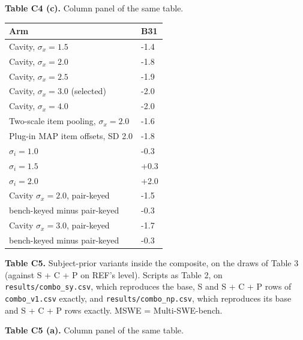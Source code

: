 \documentclass[
]{article}
\begin{document}
\textbf{Table C4 (c).} Column panel of the same table.

\begin{longtable}[]{@{}ll@{}}
\toprule\noalign{}
Arm & B31 \\
\midrule\noalign{}
\endhead
\bottomrule\noalign{}
\endlastfoot
Cavity, \(\sigma_x = 1.5\) & -1.4 \\
Cavity, \(\sigma_x = 2.0\) & -1.8 \\
Cavity, \(\sigma_x = 2.5\) & -1.9 \\
Cavity, \(\sigma_x = 3.0\) (selected) & -2.0 \\
Cavity, \(\sigma_x = 4.0\) & -2.0 \\
Two-scale item pooling, \(\sigma_x = 2.0\) & -1.6 \\
Plug-in MAP item offsets, SD 2.0 & -1.8 \\
\(\sigma_i = 1.0\) & -0.3 \\
\(\sigma_i = 1.5\) & +0.3 \\
\(\sigma_i = 2.0\) & +2.0 \\
Cavity \(\sigma_x = 2.0\), pair-keyed & -1.5 \\
bench-keyed minus pair-keyed & -0.3 \\
Cavity \(\sigma_x = 3.0\), pair-keyed & -1.7 \\
bench-keyed minus pair-keyed & -0.3 \\
\end{longtable}

\textbf{Table C5.} Subject-prior variants inside the composite, on the
draws of Table 3 (against S + C + P on REF's level). Scripts as Table 2,
on \texttt{results/combo\_sy.csv}, which reproduces the base, S and S +
C + P rows of \texttt{combo\_v1.csv} exactly, and
\texttt{results/combo\_np.csv}, which reproduces its base and S + C + P
rows exactly. MSWE = Multi-SWE-bench.

\textbf{Table C5 (a).} Column panel of the same table.
\end{document}
